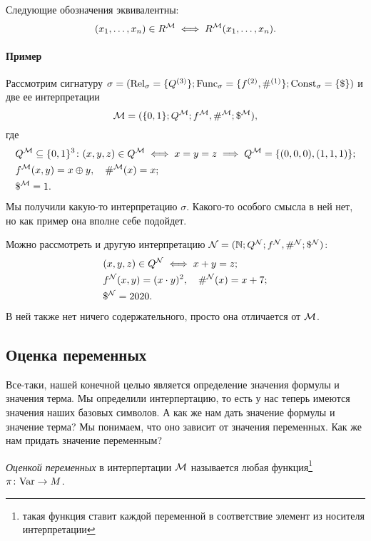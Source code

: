 \begin{convention}
    Следующие обозначения эквивалентны:
    $$
        (x_{1}, \ldots, x_{n}) \in R^{\mathcal{M}} \iff R^{\mathcal{M}}(x_{1}, \ldots, x_{n}). 
    $$
\end{convention}

\paragraph{Пример}
Рассмотрим сигнатуру $\sigma = (\mathrm{Rel}_{\sigma} = \{ Q^{(3)} \}; \mathrm{Func}_{\sigma} = \{ f^{(2)}, \#^{(1)} \}; \mathrm{Const}_{\sigma} = \{ \$ \})$ и две ее интерпретации
$$
    \mathcal{M} = ( \{ 0, 1 \}; Q^{\mathcal{M}}; f^{\mathcal{M}}, \#^{\mathcal{M}}; \$^{\mathcal{M}}),
$$
где 
\begin{align}
    &Q^{\mathcal{M}} \subseteq \{0, 1\}^{3} \colon (x, y, z) \in Q^{\mathcal{M}} \iff x = y = z \implies Q^{\mathcal{M}} = \{ (0, 0, 0), (1, 1, 1)\}; \\
    &f^{\mathcal{M}}(x, y) = x \oplus y, \quad \#^{\mathcal{M}}(x) = x; \\
    &\$^{\mathcal{M}} = 1.
\end{align}
Мы получили какую-то интерпретацию $\sigma$.
Какого-то особого смысла в ней нет, но как пример она вполне себе подойдет.

Можно рассмотреть и другую интерпретацию $\mathcal{N} = (\mathbb{N}; Q^{\mathcal{N}}; f^{\mathcal{N}}, \#^{\mathcal{N}}; \$^{\mathcal{N}})$:
\begin{align}
    &(x, y, z) \in Q^{\mathcal{N}} \iff x + y = z; \\
    &f^{\mathcal{N}}(x, y) = (x \cdot y)^{2}, \quad \#^{\mathcal{N}}(x) = x + 7; \\
    &\$^{\mathcal{N}} = 2020.
\end{align}
В ней также нет ничего содержательного, просто она отличается от $\mathcal{M}$.

\subsection{Оценка переменных}

Все-таки, нашей конечной целью является определение значения формулы и значения терма.
Мы определили интерпертацию, то есть у нас теперь имеются значения наших базовых символов.
А как же нам дать значение формулы и значение терма?
Мы понимаем, что оно зависит от значения переменных.
Как же нам придать значение переменным?

\begin{definition}
    {\it Оценкой переменных} в интерпертации $\mathcal{M}$ называется любая функция\footnote{такая функция ставит каждой переменной в соответствие элемент из носителя интерпретации} $\pi \colon \mathrm{Var} \to M$.
\end{definition}

